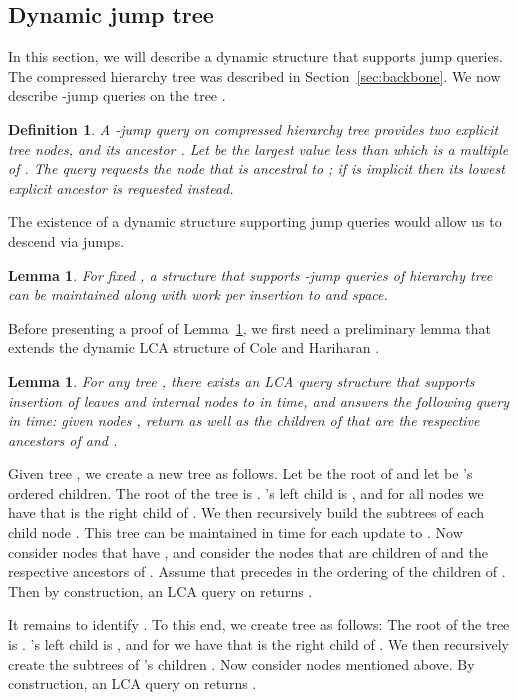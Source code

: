 \documentclass[11pt]{article}
\newtheorem{lemma}[theorem]{Lemma}
\newtheorem{definition}[theorem]{Definition}
\newenvironment{proof}{{\bf Proof:\ }}{\hfill\medskip}
\begin{document}
\subsection{Dynamic jump tree}\label{sec:jump-tree}

In this section, we will describe a dynamic structure that supports jump queries.
The compressed hierarchy tree  was described in Section~\ref{sec:backbone}. We now describe
-jump queries on the tree .

\begin{definition}
A -jump query  on compressed hierarchy tree  provides two explicit tree
nodes,  and its ancestor . Let  be the largest value less
than  which is a multiple of . The query requests the node
 that is ancestral to ; if  is implicit then its lowest
explicit ancestor is requested instead.
\end{definition}

The existence of a dynamic structure supporting jump queries would allow us to descend 
via jumps. 

\begin{lemma}\label{lem:jump}
For fixed , a structure that supports -jump queries of hierarchy tree  can
be maintained along with  work per insertion to  and  space.
\end{lemma}

Before presenting a proof of Lemma~\ref{lem:jump}, we first need a preliminary lemma
that extends the dynamic LCA structure of Cole and Hariharan \cite{CoHa05}.

\begin{lemma}\label{lem:lca-child}
For any tree , there exists an LCA query structure that supports insertion of
leaves and internal nodes to  in  time, and answers the following query in
 time: given nodes , return  as well as the
children  of  that are the respective ancestors of  and .
\end{lemma}

\begin{proof}
Given tree , we create a new tree  as follows. Let  be the root of 
and let  be 's ordered children. The root of the tree  is .
's left child is , and for all nodes  we have that 
is the right child of . We then recursively build the subtrees of each child
node . This tree can be maintained in  time for each update to .
Now consider nodes  that have , and consider the nodes
 that are children of  and the respective ancestors of .
Assume that  precedes  in the ordering of the children of . Then by
construction, an LCA query on  returns .

It remains to identify . To this end, we create tree  as follows:
The root of the tree  is . 's left child is , and for
 we have that  is the right child of . We then
recursively create the subtrees of 's children .
Now consider nodes  mentioned above. By construction, an LCA query
on  returns .
\end{proof}
\end{document}
